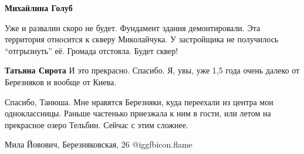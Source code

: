 \begin{itemize}
\begin{itemize}
\textbf{Михайлина Голуб} 

Уже и развалин скоро не будет. Фундамент здания демонтировали.  Эта территория
относится к скверу Миколайчука. У застройщика не получилось
\enquote{отгрызнуть} её. Громада отстояла.  Будет сквер!

\textbf{Татьяна Сирота} И это прекрасно. Спасибо. Я, увы, уже 1,5 года очень
далеко от Березняков и вообще от Киева.
\end{itemize} %


Спасибо, Танюша. Мне нравятся Березняки, куда переехали из центра мои
одноклассницы. Раньше частенько приезжала к ним в гости, или летом на прекрасное
озеро Тельбин. Сейчас с этим сложнее.

Мила Йовович, Березняковская, 26 @igg{fbicon.flame} 

\end{itemize} %
